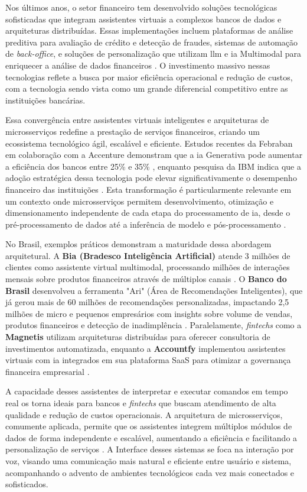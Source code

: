 Nos últimos anos, o setor financeiro tem desenvolvido soluções tecnológicas sofisticadas que integram assistentes virtuais a complexos bancos de dados e arquiteturas distribuídas. Essas implementações incluem plataformas de análise preditiva para avaliação de crédito e detecção de fraudes, sistemas de automação de \textit{back-office}, e soluções de personalização que utilizam \gls{llm} e \gls{ia} Multimodal para enriquecer a análise de dados financeiros \cite{febraban_estudo_2024}. O investimento massivo nessas tecnologias reflete a busca por maior eficiência operacional e redução de custos, com a tecnologia sendo vista como um grande diferencial competitivo entre as instituições bancárias.

Essa convergência entre assistentes virtuais inteligentes e arquiteturas de microsserviços redefine a prestação de serviços financeiros, criando um ecossistema tecnológico ágil, escalável e eficiente. Estudos recentes da Febraban em colaboração com a Accenture demonstram que a \gls{ia} Generativa pode aumentar a eficiência dos bancos entre 25\% e 35\% \cite{febraban_estudo_2024}, enquanto pesquisa da IBM indica que a adoção estratégica dessa tecnologia pode elevar significativamente o desempenho financeiro das instituições \cite{ibm_2025_2025}. Esta transformação é particularmente relevante em um contexto onde microsserviços permitem desenvolvimento, otimização e dimensionamento independente de cada etapa do processamento de \gls{ia}, desde o pré-processamento de dados até a inferência de modelo e pós-processamento \cite{nvidia_decodificando_2024}.

No Brasil, exemplos práticos demonstram a maturidade dessa abordagem arquitetural. A \textbf{Bia (Bradesco Inteligência Artificial)} atende 3 milhões de clientes como assistente virtual multimodal, processando milhões de interações mensais sobre produtos financeiros através de múltiplos canais \cite{valor_investe_os_2025}. O \textbf{Banco do Brasil} desenvolveu a ferramenta "Ari" (Área de Recomendações Inteligentes), que já gerou mais de 60 milhões de recomendações personalizadas, impactando 2,5 milhões de micro e pequenos empresários com insights sobre volume de vendas, produtos financeiros e detecção de inadimplência \cite{valor_investe_os_2025}. Paralelamente, \textit{fintechs} como a \textbf{Magnetis} utilizam arquiteturas distribuídas para oferecer consultoria de investimentos automatizada, enquanto a \textbf{Accountfy} implementou assistentes virtuais com \gls{ia} integrados em sua plataforma SaaS para otimizar a governança financeira empresarial \cite{accountfy_assistentes_2024}.

A capacidade desses assistentes de interpretar e executar comandos em tempo real os torna ideais para bancos e \textit{fintechs} que buscam atendimento de alta qualidade e redução de custos operacionais. A arquitetura de microsserviços, comumente aplicada, permite que os assistentes integrem múltiplos módulos de dados de forma independente e escalável, aumentando a eficiência e facilitando a personalização de serviços \cite{villamizar_evaluating_2023}. A Interface desses sistemas se foca na interação por voz, visando uma comunicação mais natural e eficiente entre usuário e sistema, acompanhando o advento de ambientes tecnológicos cada vez mais conectados e sofisticados.